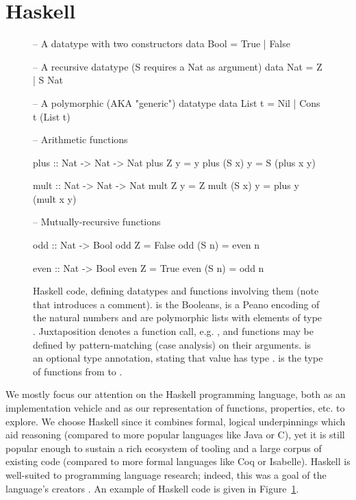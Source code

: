 \section{Haskell}
\label{sec:haskell}

\begin{figure}
  \centering
  \begin{haskell}
-- A datatype with two constructors
data Bool = True | False

-- A recursive datatype (S requires a Nat as argument)
data Nat = Z | S Nat

-- A polymorphic (AKA "generic") datatype
data List t = Nil | Cons t (List t)

-- Arithmetic functions

plus :: Nat -> Nat -> Nat
plus    Z  y = y
plus (S x) y = S (plus x y)

mult :: Nat -> Nat -> Nat
mult    Z  y = Z
mult (S x) y = plus y (mult x y)

-- Mutually-recursive functions

odd :: Nat -> Bool
odd    Z  = False
odd (S n) = even n

even :: Nat -> Bool
even    Z  = True
even (S n) = odd n
  \end{haskell}
  \caption{Haskell code, defining datatypes and functions involving them (note
    that \hs{--} introduces a comment).  is the Booleans,  is a
    Peano encoding of the natural numbers and  are polymorphic lists
    with elements of type . Juxtaposition denotes a function call, e.g.
    , and functions may be defined by pattern-matching (case analysis)
    on their arguments.  is an optional type annotation, stating that
    value  has type .  is the type of functions from
     to .}
  \label{fig:haskellexample}
\end{figure}

We mostly focus our attention on the Haskell programming language, both as an
implementation vehicle and as our representation of functions, properties, etc.
to explore. We choose Haskell since it combines formal, logical underpinnings
which aid reasoning (compared to more popular languages like Java or C), yet it
is still popular enough to sustain a rich ecosystem of tooling and a large
corpus of existing code (compared to more formal languages like Coq or
Isabelle). Haskell is well-suited to programming language research; indeed, this
was a goal of the language's creators \cite{marlow2010haskell}. An example of
Haskell code is given in Figure~\ref{fig:haskellexample}.

